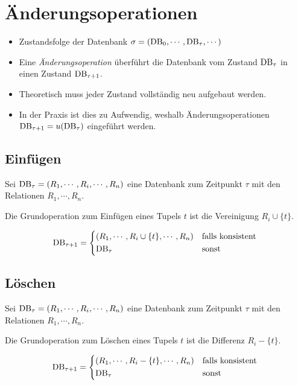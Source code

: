 	\section{Änderungsoperationen} %
		\begin{itemize}
			\item Zustandsfolge der Datenbank \( \sigma = (\operatorname{DB}_0, \cdots, \operatorname{DB}_\tau, \cdots) \)
			\item Eine \textit{Änderungsoperation} überführt die Datenbank vom Zustand \( \operatorname{DB}_\tau \) in einen Zustand \( \operatorname{DB}_{\tau + 1} \).
			\item Theoretisch muss jeder Zustand vollständig neu aufgebaut werden.
			\item In der Praxis ist dies zu Aufwendig, weshalb Änderungsoperationen \( \operatorname{DB}_{\tau+1} = u(\operatorname{DB}_\tau) \) eingeführt werden.
		\end{itemize}

		\subsection{Einfügen} %
			Sei \( \operatorname{DB}_\tau = (R_1, \cdots, R_i, \cdots, R_n) \) eine Datenbank zum Zeitpunkt \(\tau\) mit den Relationen \( R_1, \cdots, R_n \).

			Die Grundoperation zum Einfügen eines Tupels \( t \) ist die Vereinigung \( R_i \cup \{t\} \).

			\begin{equation*}
				\DB_{\tau + 1} =
				\begin{cases*}
					(R_1, \cdots, R_i \cup \{t\}, \cdots, R_n) & \text{falls konsistent} \\
					\DB_\tau                                   & \text{sonst}
				\end{cases*}
			\end{equation*}

		\subsection{Löschen} %
			Sei \( \operatorname{DB}_\tau = (R_1, \cdots, R_i, \cdots, R_n) \) eine Datenbank zum Zeitpunkt \(\tau\) mit den Relationen \( R_1, \cdots, R_n \).

			Die Grundoperation zum Löschen eines Tupels \( t \) ist die Differenz \( R_i - \{t\} \).

			\begin{equation*}
				\DB_{\tau + 1} =
				\begin{cases*}
					(R_1, \cdots, R_i - \{t\}, \cdots, R_n) & \text{falls konsistent} \\
					\DB_\tau                                & \text{sonst}
				\end{cases*}
			\end{equation*}

